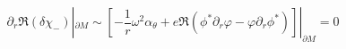 \begin{equation}
\partial_r \Re (\delta \chi_-) |_{\partial M}\sim
\left[ -\frac 1r \omega^2 \alpha_\theta + e\Re (\phi^*
\partial_r \varphi -\varphi \partial_r \phi^*) \right]|_{\partial M}=0
\label{apa6}
\end{equation}

